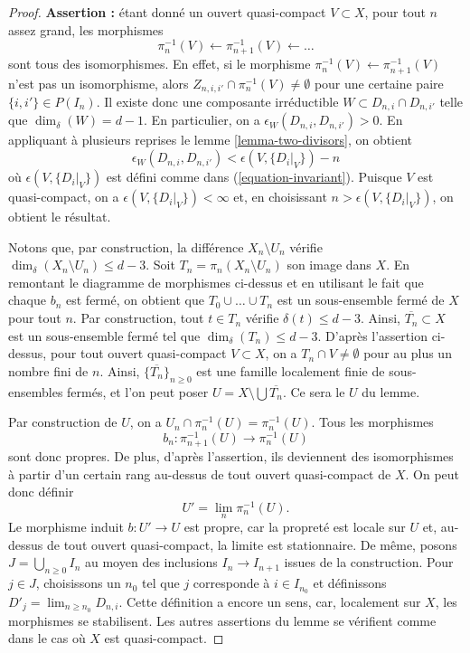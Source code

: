 \begin{proof}
\medskip\noindent
{\bf Assertion :} étant donné un ouvert quasi-compact $V \subset X$,
pour tout $n$ assez grand, les morphismes
$$
\pi_n^{-1}(V) \leftarrow \pi_{n + 1}^{-1}(V) \leftarrow \ldots
$$
sont tous des isomorphismes. En effet, si le morphisme
$\pi_n^{-1}(V) \leftarrow \pi_{n + 1}^{-1}(V)$ n'est pas un isomorphisme,
alors $Z_{n, i, i'} \cap \pi_n^{-1}(V) \not = \emptyset$ pour une certaine
paire $\{i, i'\} \in P(I_n)$. Il existe donc une composante irréductible
$W \subset D_{n, i} \cap D_{n, i'}$ telle que $\dim_\delta(W) = d - 1$.
En particulier, on a $\epsilon_W(D_{n, i}, D_{n, i'}) > 0$.
En appliquant à plusieurs reprises le lemme \ref{lemma-two-divisors}, on obtient
$$
\epsilon_W(D_{n, i}, D_{n, i'})
<
\epsilon(V, \{D_i|_V\}) - n
$$
où $\epsilon(V, \{D_i|_V\})$ est défini comme dans (\ref{equation-invariant}).
Puisque $V$ est quasi-compact, on a
$\epsilon(V, \{D_i|_V\}) < \infty$ et, en choisissant $n > \epsilon(V, \{D_i|_V\})$,
on obtient le résultat.

\medskip\noindent
Notons que, par construction, la différence $X_n \setminus U_n$
vérifie $\dim_\delta(X_n \setminus U_n) \leq d - 3$.
Soit $T_n = \pi_n(X_n \setminus U_n)$ son image dans $X$.
En remontant le diagramme de morphismes ci-dessus et en utilisant le fait que chaque $b_n$ est fermé,
on obtient que $T_0 \cup \ldots \cup T_n$ est un sous-ensemble fermé de $X$
pour tout $n$. Par construction, tout $t \in T_n$ vérifie $\delta(t) \leq d - 3$.
Ainsi, $\overline{T_n} \subset X$ est un sous-ensemble fermé
tel que $\dim_\delta(T_n) \leq d - 3$. D'après l'assertion ci-dessus,
pour tout ouvert quasi-compact $V \subset X$, on a
$T_n \cap V \not = \emptyset$ pour au plus un nombre fini de $n$.
Ainsi, $\{\overline{T_n}\}_{n \geq 0}$ est une famille localement finie
de sous-ensembles fermés, et l'on peut poser
$U = X \setminus \bigcup \overline{T_n}$. Ce sera le
$U$ du lemme.

\medskip\noindent
Par construction de $U$, on a $U_n \cap \pi_n^{-1}(U) = \pi_n^{-1}(U)$.
Tous les morphismes
$$
b_n : \pi_{n + 1}^{-1}(U) \longrightarrow \pi_n^{-1}(U)
$$
sont donc propres. De plus, d'après l'assertion, ils deviennent des isomorphismes
à partir d'un certain rang au-dessus de tout ouvert quasi-compact de $X$. On peut donc définir
$$
U' = \lim_n \pi_n^{-1}(U).
$$
Le morphisme induit $b : U' \to U$ est propre, car la propreté est locale
sur $U$ et, au-dessus de tout ouvert quasi-compact, la limite est stationnaire. De même,
posons $J = \bigcup_{n \geq 0} I_n$ au moyen des inclusions
$I_n \to I_{n + 1}$ issues de la construction. Pour $j \in J$, choisissons
un $n_0$ tel que $j$ corresponde à $i \in I_{n_0}$ et définissons
$D'_j = \lim_{n \geq n_0} D_{n, i}$. Cette définition a encore un sens,
car, localement sur $X$, les morphismes se stabilisent.
Les autres assertions du lemme se vérifient comme dans le cas où
$X$ est quasi-compact.
\end{proof}









